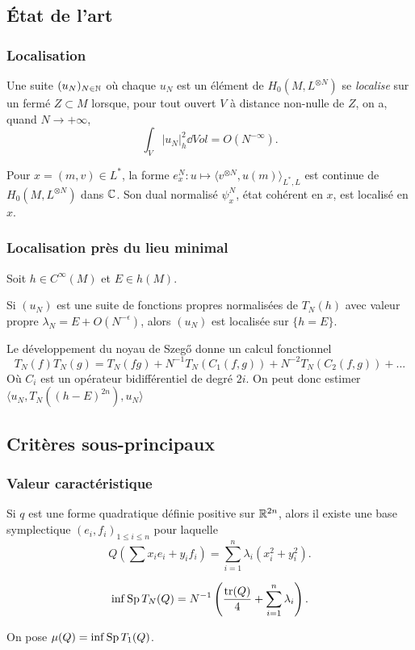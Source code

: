 \documentclass[mathserif]{beamer}
\begin{document}
\subsection{\'Etat de l'art}
\begin{frame}
  \frametitle{Localisation}
  \begin{defn}
    Une suite $(u_N)_{N\in \mathbb{N}}$ où chaque $u_N$ est un élément de
    $H_0(M,L^{\otimes N})$ se \emph{localise} sur un fermé $Z\subset
    M$ lorsque, pour tout ouvert $V$ à distance non-nulle de $Z$, on
    a, quand $N\to +\infty$,
    \[
      \int_V |u_N|^2_h\dd Vol=O(N^{-\infty}).
    \]
  \end{defn}
  \begin{ex}
    Pour $x=(m,v)\in L^*$, la forme $e_x^N:u\mapsto
    \langle v^{\otimes N},u(m)\rangle_{L^*,L}$ est continue de $H_0(M,L^{\otimes N})$ dans $\mathbb{C}$. Son dual
    normalisé $\psi_x^N$, état cohérent en $x$, est localisé en $x$.
  \end{ex}
\end{frame}

\begin{frame}
  \frametitle{Localisation près du lieu minimal}
  \begin{prop}
    Soit $h\in C^{\infty}(M)$ et $E\in h(M)$.

    Si $(u_N)$ est une suite de fonctions propres normalis\'ees de
    $T_N(h)$ avec valeur propre $\lambda_N=E+O(N^{-\epsilon})$, alors $(u_N)$ est
    localisée sur $\{h=E\}$.
  \end{prop}
  \begin{preuve}
    Le d\'eveloppement du noyau de Szeg\H{o} donne un calcul
    fonctionnel
    \[
      T_N(f)T_N(g)=T_N(fg)+N^{-1}T_N(C_1(f,g))+N^{-2}T_N(C_2(f,g))+...
    \]
    Où $C_i$ est un opérateur bidifférentiel de degré $2i$.
    On peut donc estimer $\langle u_N,T_N((h-E)^{2n}),u_N\rangle$
  \end{preuve}
\end{frame}

\subsection{Critères sous-principaux}
\begin{frame}
  \frametitle{Valeur caractéristique}
  Si $q$ est une forme quadratique définie positive sur $\mathbb{R}^{2n}$,
  alors il existe une base symplectique $(e_i,f_i)_{1\leq i \leq n}$
  pour laquelle
  \[
    Q\left(\sum x_ie_i+y_if_i\right)=\sum_{i=1}^n \lambda_i(x_i^2+y_i^2).
  \]
  \begin{prop}
    \[\inf\operatorname{Sp} T_N(Q)=N^{-1}\left(\frac {\operatorname{tr}(Q)}{4}+\sum_{i=1}^n\lambda_i\right).\]
  \end{prop}
  On pose $\mu(Q)=\inf\operatorname{Sp} T_1(Q)$.
\end{frame}
\end{document}
